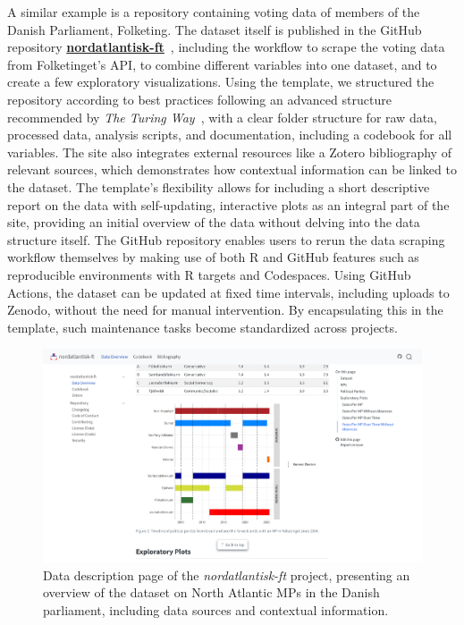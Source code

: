 \documentclass[final]{anthology-ch} %
\begin{document}
A similar example is a repository containing voting data of members of the Danish Parliament, Folketing. The dataset itself is published in the GitHub repository \href{http://mtwente.github.io/nordatlantisk-ft}{\textbf{nordatlantisk-ft}}~\cite{twente2024a}, including the workflow to scrape the voting data from Folketinget's API, to combine different variables into one dataset, and to create a few exploratory visualizations. Using the template, we structured the repository according to best practices following an advanced structure recommended by \emph{The Turing Way}~\cite{theturingwaycommunity2025}, with a clear folder structure for raw data, processed data, analysis scripts, and documentation, including a codebook for all variables. The site also integrates external resources like a Zotero bibliography of relevant sources, which demonstrates how contextual information can be linked to the dataset. The template's flexibility allows for including a short descriptive report on the data with self-updating, interactive plots as an integral part of the site, providing an initial overview of the data without delving into the data structure itself. The GitHub repository enables users to rerun the data scraping workflow themselves by making use of both R and GitHub features such as reproducible environments with R targets and Codespaces. Using GitHub Actions, the dataset can be updated at fixed time intervals, including uploads to Zenodo, without the need for manual intervention. By encapsulating this in the template, such maintenance tasks become standardized across projects.

\begin{figure}[t!]
  \centering
  \includegraphics[width=0.9\linewidth]{figures/nordatlantisk_ft_report.png}
  \caption{Data description page of the \emph{nordatlantisk-ft} project, presenting an overview of the dataset on North Atlantic MPs in the Danish parliament, including data sources and contextual information.}
  \label{fig-nordatlantisk}
\end{figure}
\end{document}
